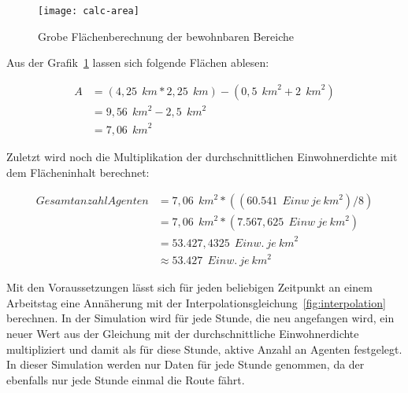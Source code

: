 \begin{figure}[h]
    \centering
    \texttt{[image: calc-area]}
    \caption{Grobe Flächenberechnung der bewohnbaren Bereiche}
    \label{fig:calc-area}
\end{figure}

Aus der Grafik~\ref{fig:calc-area} lassen sich folgende Flächen ablesen:

\begin{align}
    A &= (4,25~\unit{~km} * 2,25~\unit{~km}) - (0,5~\unit{~km}^2 + 2~\unit{~km}^2) \\
    &=  9,56~\unit{~km}^2 - 2,5~\unit{~km}^2 \\
    &=  7,06~\unit{~km}^2
\end{align}

Zuletzt wird noch die Multiplikation der durchschnittlichen Einwohnerdichte mit dem Flächeninhalt berechnet:

\begin{align}
    Gesamtanzahl Agenten &= 7,06~\unit{~km}^2 * ((60.541~\unit{~Einw~je~km}^2) / 8) \\
    &= 7,06~\unit{~km}^2 * (7.567,625~\unit{~Einw~je~km}^2) \\
    &= 53.427,4325~\unit{~Einw.~je~km}^2 \\
    &\approx 53.427~\unit{~Einw.~je~km}^2
\end{align}

Mit den Voraussetzungen lässt sich für jeden beliebigen Zeitpunkt an einem Arbeitstag eine Annäherung mit der Interpolationsgleichung~\ref{fig:interpolation} berechnen.
In der Simulation wird für jede Stunde, die neu angefangen wird, ein neuer Wert aus der Gleichung mit der durchschnittliche Einwohnerdichte multipliziert und damit als für diese Stunde, aktive Anzahl an Agenten festgelegt.
In dieser Simulation werden nur Daten für jede Stunde genommen, da der  ebenfalls nur jede Stunde einmal die Route fährt.
